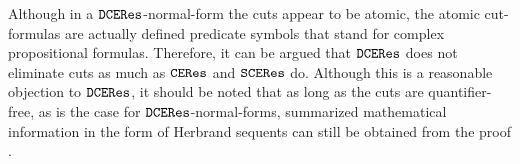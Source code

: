 \begin{landscape}
\noindent
Although in a $\texttt{DCERes}$-normal-form the cuts appear to be atomic, 
the atomic cut-formulas are actually defined predicate symbols that stand
for complex propositional formulas. Therefore, it can be argued that 
$\texttt{DCERes}$ does not eliminate cuts as much as $\texttt{CERes}$ and $\texttt{SCERes}$ do. 
Although this is a reasonable objection to $\texttt{DCERes}$, it should be noted 
that as long as the cuts are quantifier-free, as is the case for 
$\texttt{DCERes}$-normal-forms, summarized mathematical information in the form 
of Herbrand sequents can still be obtained from the proof \cite{Paleo2007Herbrand-Sequent-Extraction,Paleo2008Herbrand-Sequent-Extraction,HetzlLeitschWellerPaleo2008Herbrand-Sequent-Extraction}.
\end{landscape}
